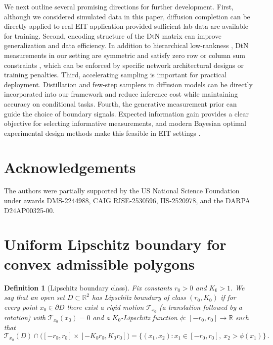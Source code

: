 \documentclass{article}
\newcommand{\R}{\mathbb{R}}
\newtheorem{definition}{Definition}[section]
\begin{document}
We next outline several promising directions for further development. First, although we considered simulated data in this paper, diffusion completion can be directly applied to real EIT application provided sufficient lab data are available for training. Second, encoding structure of the DtN matrix can improve generalization and data efficiency. In addition to hierarchical low-rankness \citep{bebendorf2003existence, ballani2017matrices}, DtN measurements in our setting are symmetric and satisfy zero row or column sum constraints \citep{somersalo1992existence}, which can be enforced by specific network architectural designs or training penalties. Third, accelerating sampling is important for practical deployment. Distillation \citep{song2023consistency} and few-step samplers \citep{song2020denoising} in diffusion models can be directly incorporated into our framework and reduce inference cost while maintaining accuracy on conditional tasks. Fourth, the generative measurement prior can guide the choice of boundary signals. Expected information gain provides a clear objective for selecting informative measurements, and modern Bayesian optimal experimental design methods make this feasible in EIT settings \citep{dong2025variational, hellmuth2025data}.



\section{Acknowledgements}
The authors were partially supported by the US National Science Foundation under awards DMS-2244988, CAIG RISE-2530596, IIS-2520978, and the DARPA D24AP00325-00.
   
\newpage

  

\newpage
\appendix
\section{Uniform Lipschitz boundary for convex admissible polygons}
\label{sec:lipschitz_bdy_class}
\begin{definition}[Lipschitz boundary class]
\label{def: lipschitz_bdy_class}
    Fix constants $r_0>0$ and $K_0> 1$.
We say that an open set $D\subset\R^2$ has \emph{Lipschitz boundary of class $(r_0,K_0)$} if for every point
$x_0\in\partial D$ there exist a rigid motion $\mathcal T_{x_0}$ (a translation followed by a rotation) with
$\mathcal T_{x_0}(x_0)=0$ and a $K_0$-Lipschitz function $\phi:\,[-r_0,r_0]\to\R$ such that
\[
\mathcal T_{x_0}(D)\cap\big([-r_0,r_0]\times[-K_0r_0,K_0r_0]\big)
=\{(x_1,x_2): x_1\in[-r_0,r_0],\ x_2>\phi(x_1)\}\,.
\]
\end{definition}
\end{document}
